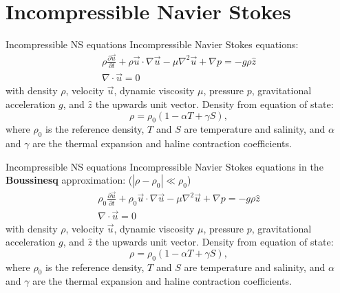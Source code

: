 \documentclass[12pt]{beamer}
\newcommand\pp[2]{\frac{\partial #1}{\partial #2}}
\newcommand\ppt[1]{\pp{#1}t}
\newcommand\grad\nabla
\renewcommand\div{\nabla\cdot}
\renewcommand\emph[1]{{\bf #1}}
\begin{document}
\section{Incompressible Navier Stokes}
\begin{frame}{Incompressible NS equations}
  Incompressible Navier Stokes equations:
  \begin{gather*}
    \rho\ppt{\vec u} + \rho\vec u\cdot\grad\vec u - \mu \nabla^2 \vec u 
      + \grad p = -g \rho \hat z \\
    \div \vec u =0
  \end{gather*}
  with density $\rho$, velocity $\vec u$, dynamic viscosity $\mu$, 
  pressure $p$, gravitational acceleration $g$, and $\hat z$ the upwards unit
  vector. Density from equation of state:
  \begin{equation*}
    \rho = \rho_0 \left( 1 - \alpha T + \gamma S\right),
  \end{equation*}
  where $\rho_0$ is the reference density, $T$ and $S$ are temperature and
  salinity, and $\alpha$ and $\gamma$ are the thermal expansion and haline
  contraction coefficients.
\end{frame}

\begin{frame}{Incompressible NS equations}
  Incompressible Navier Stokes equations in the \emph{Boussinesq} approximation:
  ($|\rho-\rho_0|\ll \rho_0$)
  \begin{gather*}
    \rho_0\ppt{\vec u} + \rho_0\vec u\cdot\grad\vec u - \mu \nabla^2 \vec u 
      + \grad p = -g \rho \hat z \\
    \div \vec u =0
  \end{gather*}
  with density $\rho$, velocity $\vec u$, dynamic viscosity $\mu$, 
  pressure $p$, gravitational acceleration $g$, and $\hat z$ the upwards unit
  vector. Density from equation of state:
  \begin{equation*}
    \rho = \rho_0 \left( 1 - \alpha T + \gamma S\right),
  \end{equation*}
  where $\rho_0$ is the reference density, $T$ and $S$ are temperature and
  salinity, and $\alpha$ and $\gamma$ are the thermal expansion and haline
  contraction coefficients.
\end{frame}
\end{document}

